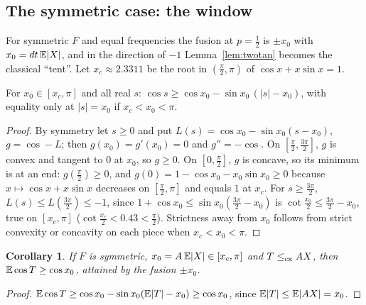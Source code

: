 \documentclass[11pt]{amsart}
\newtheorem{corollary}[theorem]{Corollary}\newtheorem{conjecture}[theorem]{Conjecture}
\theoremstyle{definition}\newtheorem{definition}[theorem]{Definition}\theoremstyle{remark}\newtheorem{remark}[theorem]{Remark}
\begin{document}
\subsection{The symmetric case: the window}
For symmetric $F$ and equal frequencies the fusion at $p=\frac12$ is $\pm x_0$ with $x_0=dt\,\mathbb E|X|$, and in the direction of $-1$ Lemma~\ref{lem:twotan} becomes
the classical ``tent''. Let $x_c\approx2.3311$ be the root in $(\frac\pi2,\pi)$ of $\cos x+x\sin x=1$.
\begin{lemma}[window]\label{lem:window}
For $x_0\in[x_c,\pi]$ and all real $s$: $\cos s\ge\cos x_0-\sin x_0\,(|s|-x_0)$, with equality only at $|s|=x_0$ if $x_c<x_0<\pi$.
\end{lemma}
\begin{proof}By symmetry let $s\ge0$ and put $L(s)=\cos x_0-\sin x_0(s-x_0)$, $g=\cos-L$; then $g(x_0)=g'(x_0)=0$ and $g''=-\cos$. On $[\frac\pi2,\frac{3\pi}2]$, $g$ is convex
and tangent to $0$ at $x_0$, so $g\ge0$. On $[0,\frac\pi2]$, $g$ is concave, so its minimum is at an end: $g(\frac\pi2)\ge0$, and $g(0)=1-\cos x_0-x_0\sin x_0\ge0$
because $x\mapsto\cos x+x\sin x$ decreases on $[\frac\pi2,\pi]$ and equals $1$ at $x_c$. For $s\ge\frac{3\pi}2$, $L(s)\le L(\frac{3\pi}2)\le-1$, since
$1+\cos x_0\le\sin x_0(\frac{3\pi}2-x_0)$ is $\cot\frac{x_0}2\le\frac{3\pi}2-x_0$, true on $[x_c,\pi]$ ($\cot\frac{x_c}2<0.43<\frac\pi2$). Strictness away from $x_0$ follows
from strict convexity or concavity on each piece when $x_c<x_0<\pi$.\end{proof}
\begin{corollary}\label{cor:window}
If $F$ is symmetric, $x_0=A\,\mathbb E|X|\in[x_c,\pi]$ and $T\le_{\mathrm{cx}} AX$, then $\mathbb E\cos T\ge\cos x_0$, attained by the fusion $\pm x_0$.
\end{corollary}
\begin{proof}$\mathbb E\cos T\ge\cos x_0-\sin x_0(\mathbb E|T|-x_0)\ge\cos x_0$, since $\mathbb E|T|\le\mathbb E|AX|=x_0$.\end{proof}
\end{document}
